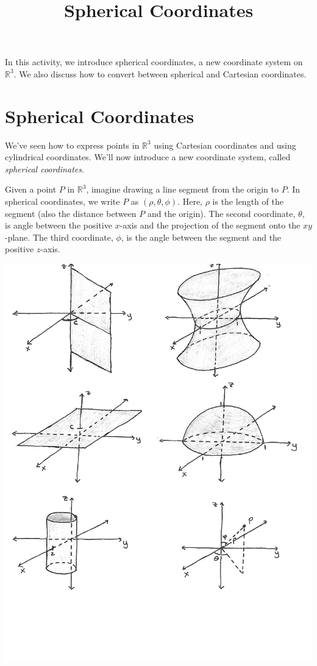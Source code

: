 \documentclass{ximera}
\title{Spherical Coordinates}
\begin{document}
\begin{abstract}
\end{abstract}
\maketitle

In this activity, we introduce spherical coordinates, a new coordinate system on $\mathbb{R}^3$. We also discuss how to convert between spherical and Cartesian coordinates.

\section{Spherical Coordinates}

We've seen how to express points in $\mathbb{R}^3$ using Cartesian coordinates and using cylindrical coordinates. We'll now introduce a new coordinate system, called \emph{spherical coordinates}.

Given a point $P$ in $\mathbb{R}^3$, imagine drawing a line segment from the origin to $P$. In spherical coordinates, we write $P$ as $(\rho, \theta, \phi)$. Here, $\rho$ is the length of the segment (also the distance between $P$ and the origin). The second coordinate, $\theta$, is angle between the positive $x$-axis and the projection of the segment onto the $xy$-plane. The third coordinate, $\phi$, is the angle between the segment and the positive $z$-axis.

\begin{image}
\includegraphics{spherical}
\end{image}
\end{document}
